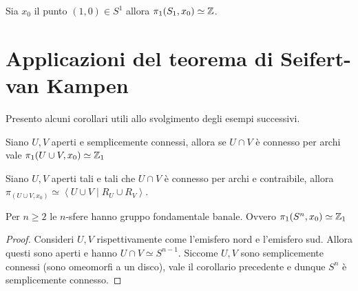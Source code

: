 \begin{theorem}
	Sia $x_0$ il punto $(1,0) \in S^1$ allora $\pi_1(S_1, x_0) \simeq \mathbb{Z}$.
\end{theorem}


\section{Applicazioni del teorema di Seifert-van Kampen}

Presento alcuni corollari utili allo svolgimento degli esempi successivi.

\begin{corollary}
	Siano $U,V$ aperti e semplicemente connessi, allora se $U \cap V$ è connesso per archi vale $\pi_1(U\cup V,x_0) \simeq \mathbb{Z}_1$ 
\end{corollary}

\begin{corollary}
	Siano $U,V$ aperti tali e tali che $U \cap V$ è connesso per archi e contraibile, allora $\pi_(U \cup V, x_0) \simeq \left\langle U \cup V \mid R_U \cup R_V\right\rangle$.
\end{corollary}


\begin{xca}
	Per $n \ge 2$ le $n$-sfere hanno gruppo fondamentale banale. Ovvero $\pi_1(S^n, x_0) \simeq \mathbb{Z}_1$
\end{xca}
\begin{proof}
	Consideri $U,V$ rispettivamente come l'emisfero nord e l'emisfero sud. Allora questi sono aperti e hanno $U \cap V \simeq S^{n-1}$. Siccome $U, V$ sono semplicemente connessi (sono omeomorfi a un disco), vale il corollario precedente e dunque $S^n$ è semplicemente connesso.  
\end{proof}

